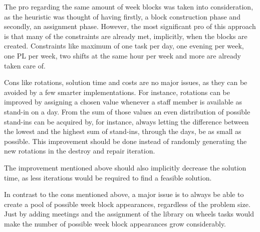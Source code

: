 The pro regarding the same amount of week blocks was taken into consideration, as the heuristic was thought of having firstly, a block construction phase and secondly, an assignment phase. However, the most significant pro of this approach is that many of the constraints are already met, implicitly, when the blocks are created. Constraints like maximum of one task per day, one evening per week, one PL per week, two shifts at the same hour per week and more are already taken care of. 

Cons like rotations, solution time and costs are no major issues, as they can be avoided by a few smarter implementations. For instance, rotations can be improved by assigning a chosen value whenever a staff member is available as stand-in on a day. From the sum of those values an even distribution of possible stand-ins can be acquired by, for instance, always letting the difference between the lowest and the highest sum of stand-ins, through the days, be as small as possible. This improvement should be done instead of randomly generating the new rotations in the destroy and repair iteration. 

The improvement mentioned above should also implicitly decrease the solution time, as less iterations would be required to find a feasible solution.

In contrast to the cons mentioned above, a major issue is to always be able to create a pool of possible week block appearances, regardless of the problem size. Just by adding meetings and the assignment of the library on wheels tasks would make the number of possible week block appearances grow considerably.


